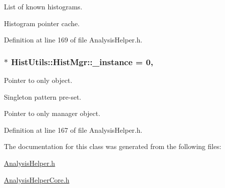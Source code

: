 List of known histograms. 

Histogram pointer cache. 

Definition at line 169 of file Analysis\+Helper.\+h.

\subsubsection[{\texorpdfstring{\+\_\+instance}{_instance}}]{ $\ast$ Hist\+Utils\+::\+Hist\+Mgr\+::\+\_\+instance = 0\hspace{0.3cm}{\ttfamily [static]}, {\ttfamily [private]}}\hypertarget{classHistUtils_1_1HistMgr_a9941e8757f5e3dabfc24422822857fe6}{}\label{classHistUtils_1_1HistMgr_a9941e8757f5e3dabfc24422822857fe6}


Pointer to only object. 

Singleton pattern pre-\/set.

Pointer to only manager object. 

Definition at line 167 of file Analysis\+Helper.\+h.



The documentation for this class was generated from the following files\+:\begin{DoxyCompactItemize}
\item 
\hyperlink{AnalysisHelper_8h}{Analysis\+Helper.\+h}\item 
\hyperlink{AnalysisHelperCore_8h}{Analysis\+Helper\+Core.\+h}\end{DoxyCompactItemize}
